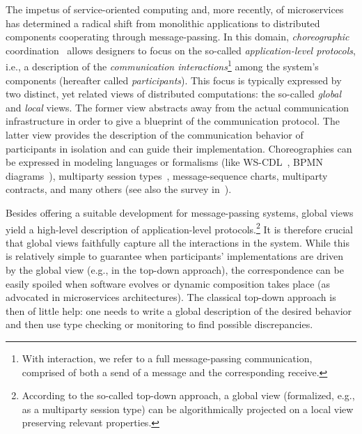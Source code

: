 The impetus of service-oriented computing and, more recently, of microservices has determined a radical shift from monolithic applications to distributed components cooperating through message-passing.
%
In this domain, \emph{choreographic} coordination~\cite{WS-CDL} allows designers to focus on the so-called \emph{application-level protocols}, i.e., a description of the \emph{communication interactions}\footnote{%
  With interaction, we refer to a full message-passing communication, comprised of both a send of a message and the corresponding receive.}  among the system's components (hereafter called
\emph{participants}).
% 
This focus is typically expressed by two distinct, yet related views
of distributed computations: the so-called \emph{global} and
\emph{local} views.
%
The former view abstracts away from the actual communication
infrastructure in order to give a blueprint of the communication
protocol.
%
The latter view provides the description of the communication
behavior of participants in isolation and can guide their
implementation.
Choreographies can be expressed in modeling languages or formalisms
(like WS-CDL~\cite{WS-CDL}, BPMN diagrams~\cite{BPMN}),
multiparty session types~\cite{HondaYC16}, message-sequence charts,
multiparty contracts, and many others (see also the survey
in~\cite{Huttel+16}).

Besides offering a suitable development for message-passing systems,
global views yield a high-level description of application-level
protocols.\footnote{According to the so-called top-down approach, a
  global view (formalized, e.g., as a multiparty session type) can be
  algorithmically projected on a local view preserving relevant
  properties.}
%
It is therefore crucial that global views faithfully capture
all the interactions in the system.
%
While this is relatively simple to guarantee when participants'
implementations are driven by the global view (e.g., in the top-down
approach), the correspondence can be easily spoiled when software
evolves or dynamic  composition  takes place (as advocated in
microservices architectures).
%
The classical top-down approach is then of little help: one needs to
write a global description of the desired behavior and then use type
checking or monitoring to find possible discrepancies.
